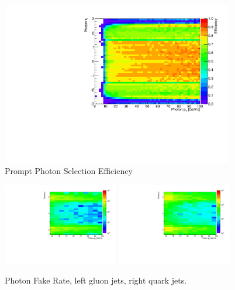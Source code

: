 \documentclass{cmspaper}
\begin{document}
\begin{figure}[h]
  \centering
  \includegraphics[width=0.9\textwidth]{figures/EfficiencyPtEta_PromptPhoton.pdf}
  \caption{Prompt Photon Selection Efficiency}
  \label{fig:photonEfficiency}
\end{figure}

\begin{figure}[h]
  \centering
  \includegraphics[width=0.45\textwidth]{figures/EfficiencyPtEta_GluonJetFakesPhoton.pdf}
  \includegraphics[width=0.45\textwidth]{figures/EfficiencyPtEta_QuarkJetFakesPhoton.pdf}
  \caption{Photon Fake Rate, left gluon jets, right quark jets.}
  \label{fig:photonFakeRate}
\end{figure}
\end{document}
